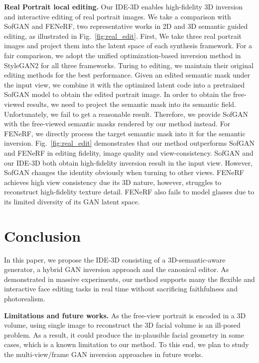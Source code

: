 \documentclass[acmtog]{acmart}
\begin{document}
\noindent \textbf{Real Portrait local editing.}
Our IDE-3D enables high-fidelity 3D inversion and interactive editing of real portrait images. We take a comparison with SofGAN and FENeRF, two representative works in 2D and 3D semantic guided editing, as illustrated in Fig.~\ref{fig:real_edit}. First, We take three real portrait images and project them into the latent space of each synthesis framework. For a fair comparison, we adopt the unified optimization-based inversion method in StyleGAN2 \cite{karras2020analyzing} for all three frameworks. Turing to editing, we maintain their original editing methods for the best performance. Given an edited semantic mask under the input view, we combine it with the optimized latent code into a pretrained SofGAN model to obtain the edited portrait image. In order to obtain the free-viewed results, we need to project the semantic mask into its semantic field. Unfortunately, we fail to get a reasonable result. Therefore, we provide SofGAN with the free-viewed semantic masks rendered by our method instead. For FENeRF, we directly process the target semantic mask into it for the semantic inversion. Fig.~\ref{fig:real_edit} demonstrates that our method outperforms SofGAN and FENeRF in editing fidelity, image quality and view-consistency. SofGAN and our IDE-3D both obtain high-fidelity inversion result in the input view. However, SofGAN changes the identity obviously when turning to other views. FENeRF achieves high view consistency due its 3D nature, however, struggles to reconstruct high-fidelity texture detail. FENeRF also fails to model glasses due to its limited diversity of its GAN latent space. 

\section{Conclusion}
In this paper, we propose the IDE-3D consisting of a 3D-semantic-aware generator, a hybrid GAN inversion approach and the canonical editor. As demonstrated in massive experiments, our method supports many the flexible and interactive face editing tasks in real time without sacrificing faithfulness and photorealism.

\noindent \textbf{Limitations and future works.} As the free-view portrait is encoded in a 3D volume, using single image to reconstruct the 3D facial volume is an ill-posed problem. As a result, it could produce the in-plausible facial geometry in some cases, which is a known limitation  to our method. To this end, we plan to study the multi-view/frame GAN inversion approaches in future works.


\end{document}
